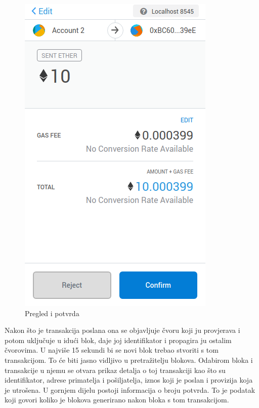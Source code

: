\documentclass[times, utf8, zavrsni]{fer}
\begin{document}
\begin{figure}[ht]
\begin{minipage}[b]{0.4\textwidth}
    \includegraphics[width=\textwidth]{sent.png}
    \caption{Pregled i potvrda}
  \end{minipage}
\end{figure}

Nakon što je transakcija poslana ona se objavljuje čvoru koji ju provjerava i potom uključuje u idući blok, daje joj identifikator i propagira ju ostalim čvorovima.
U najviše 15 sekundi bi se novi blok trebao stvoriti s tom transakcijom. To će biti jasno vidljivo u pretražitelju blokova. Odabirom bloka i transakcije u njemu se otvara 
prikaz detalja o toj transakciji kao što su identifikator, adrese primatelja i pošiljatelja, iznos koji je poslan i provizija koja je utrošena. U gornjem dijelu postoji
informacija o broju potvrda. To je podatak koji govori koliko je blokova generirano nakon bloka s tom transakcijom.
\end{document}

